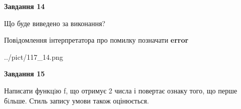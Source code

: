 \documentclass[11pt, ukrainian]{article}
\begin{document}
{\begin {large}
{\begin {center}\textbf{Завдання 14}\end {center}}\par
Що буде виведено за виконання? \par
Повідомлення інтерпретатора про помилку позначати \textbf{error}

\begin{center}
	{../pict/117_14.png}
\end{center}
\newpage

{\begin {center}\textbf{Завдання 15}\end {center}}\par

Написати функцiю f, що отримує 2 числа і повертає ознаку того, що перше бiльше. Стиль запису умови також оцінюється.\par
\newpage

\end {large}}
\end{document}
